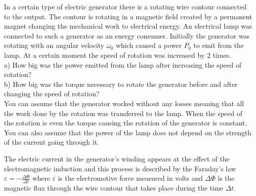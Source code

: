 In a certain type of electric generator there is a rotating wire contour connected to the output. The contour is rotating in a magnetic field created by a permanent magnet changing the mechanical work to electrical energy. An electrical lamp was connected to such a generator as an energy consumer. Initially the generator was rotating with an angular velocity $\omega_0$ which caused a power $P_0$ to emit from the lamp. At a certain moment the speed of rotation was increased by 2 times.\\
a) How big was the power emitted from the lamp after increasing the speed of rotation?\\
b) How big was the torque necessary to rotate the generator before and after changing the speed of rotation?\\
You can assume that the generator worked without any losses meaning that all the work done by the rotation was transferred to the lamp. When the speed of the rotation is even the torque causing the rotation of the generator is constant. You can also assume that the power of the lamp does not depend on the strength of the current going through it.

\hinteng
The electric current in the generator’s winding appears at the effect of the electromagnetic induction and this process is described by the Faraday’s law $\varepsilon = -\frac{\Delta\Phi}{\Delta t}$ where $\varepsilon$ is the electromotive force measured in volts and $\Delta\Phi$ is the magnetic flux through the wire contour that takes place during the time $\Delta t$.

